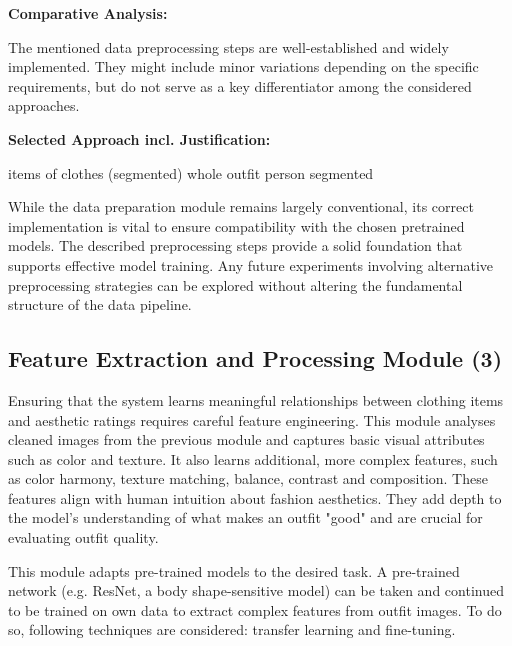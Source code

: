 \vspace{0.5cm}

\textbf{Comparative Analysis:}

\vspace{0.5cm}

The mentioned data preprocessing steps are well-established and widely implemented. They might include minor variations depending on the specific requirements, but do not serve as a key differentiator among the considered approaches.

\vspace{0.5cm}

\textbf{Selected Approach incl. Justification:}

\vspace{0.5cm}

items of clothes (segmented)
whole outfit
person segmented

While the data preparation module remains largely conventional, its correct implementation is vital to ensure compatibility with the chosen pretrained models. The described preprocessing steps provide a solid foundation that supports effective model training. Any future experiments involving alternative preprocessing strategies can be explored without altering the fundamental structure of the data pipeline.

\subsection{Feature Extraction and Processing Module (3)}

Ensuring that the system learns meaningful relationships between clothing items and aesthetic ratings requires careful feature engineering. This module analyses cleaned images from the previous module and captures basic visual attributes such as color and texture. It also learns additional, more complex features, such as color harmony, texture matching, balance, contrast and composition. These features align with human intuition about fashion aesthetics. They add depth to the model's understanding of what makes an outfit "good" and are crucial for evaluating outfit quality.

This module adapts pre-trained models to the desired task. A pre-trained network (e.g. \acs{ResNet}, a body shape-sensitive model) can be taken and continued to be trained on own data to extract complex features from outfit images. To do so, following techniques are considered: transfer learning and fine-tuning.

